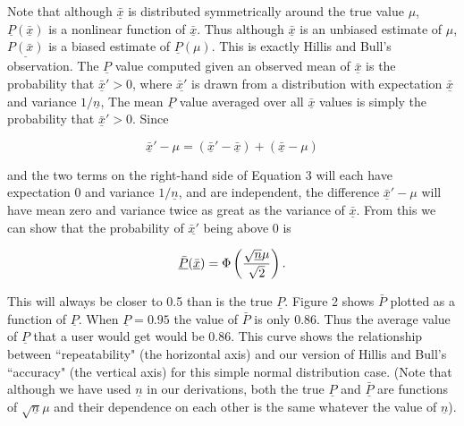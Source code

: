 {Note that although $\underline{\bar x}$ is distributed symmetrically around the
true value $\mu$, $\underline{P}(\underline{\bar x})$ is a nonlinear function of $\underline{\bar x}$.
Thus although $\underline{\bar x}$ is an unbiased estimate of $\mu$, $\underline{P(\bar x)}$ is a
biased estimate of $\underline{P}(\mu)$.  This is exactly Hillis and Bull's observation.
The $\underline{P}$ value computed given an observed mean of $\underline{\bar x}$ is the probability
that $\underline{{\bar x}}' > 0$, where $\underline{{\bar x}'}$ is drawn from a distribution with
expectation $\underline{\bar x}$ and variance $1/\underline{n}$,  The mean $\underline{P}$ value averaged over
all $\underline{\bar x}$ values is simply the probability that $\underline{\bar x}' > 0$.  Since
\bigskip
\bigskip
   
\begin{equation} %
\underline{\bar x}' - \mu = (\underline{\bar x}' - \underline{\bar x}) + (\underline{\bar x} - \mu)
\end{equation}
\bigskip
\bigskip

\noindent
and the two terms on the right-hand side of Equation 3 will each have expectation $0$
and variance $1/\underline{n}$, and are independent, the
difference $\underline{\bar x}' - \mu$ will have mean zero and
variance twice as great as the variance of $\underline{\bar x}$.  From this we
can show that the probability of $\underline{{\bar x}'}$ being above 0 is
\bigskip
\bigskip
  
\begin{equation} %
{\underline{\bar P}}({\underline{\bar x}})  =  \Phi\left({\sqrt{\underline{n}} \mu \over \sqrt{2}} \right).
\end{equation}
\bigskip
\bigskip

\noindent
This will always be closer to 0.5 than is the true $\underline{P}$.  Figure 2 shows $\bar P$
plotted as a function of $\underline{P}$.  When $\underline{P} = 0.95$ the value of $\bar P$ is only
0.86.  Thus the average value of $\underline{P}$ that a user would get would be 0.86.
This curve shows the relationship between ``repeatability"
(the horizontal axis) and our version of Hillis and Bull's ``accuracy" (the vertical axis) for
 this simple
normal distribution case.  (Note that although we have used $\underline{n}$ in our
derivations, both the true $\underline{P}$
and $\underline{\bar P}$ are functions of $\sqrt{\underline{n}} \mu$ and their dependence on each
other is the same whatever the value of $\underline{n}$).

}
